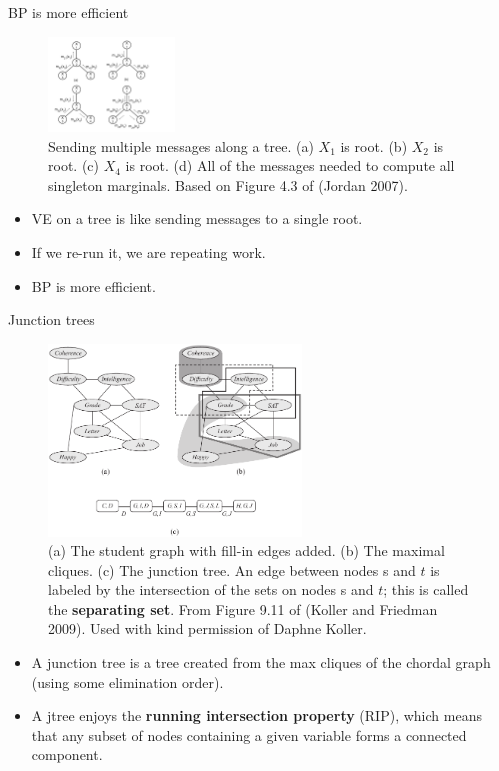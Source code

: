 \documentclass[10pt,mathserif]{beamer}
\begin{document}
\begin{frame}{BP is more efficient}
\begin{figure}[h]
\centering
\includegraphics[width=0.3\textwidth]{treeMsgPassing}
\caption{Sending multiple messages along a tree. (a) $X_1$ is root. (b) $X_2$ is root. (c) $X_4$ is root. (d) All of the messages needed to compute all singleton marginals. Based on Figure 4.3 of (Jordan 2007).}
\end{figure}

\begin{itemize}
    \item VE on a tree is like sending messages to a single root. 
    \item If we re-run it, we are repeating work.
    \item BP is more efficient.
\end{itemize}
\end{frame}

\begin{frame}{Junction trees}
\begin{figure}[h]
\centering     %
\includegraphics[width=0.6\textwidth]{koller-9-11}
\caption{(a) The student graph with fill-in edges added. (b) The maximal cliques. (c) The junction tree. An edge between nodes s and $t$ is labeled by the intersection of the sets on nodes s and $t$; this is called the \textbf{separating set}. From Figure 9.11 of (Koller and Friedman 2009). Used with kind permission of Daphne Koller.}
\end{figure}

\begin{itemize}
    \item A junction tree is a tree created from the max cliques of the chordal graph (using some elimination order).
    \item A jtree enjoys the \textbf{running intersection property} (RIP), which means that any subset of nodes containing a given variable forms a connected component.
\end{itemize}
\end{frame}
\end{document}
